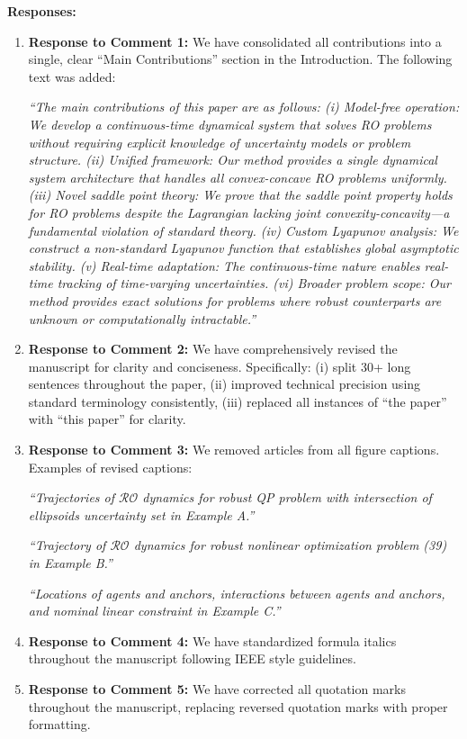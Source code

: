 \documentclass[journal,twoside,web]{ieeecolor}
\begin{document}
\noindent\textbf{Responses:}

\begin{enumerate}
\item \textbf{Response to Comment 1:} We have consolidated all contributions into a single, clear ``Main Contributions'' section in the Introduction. The following text was added:

{\color{revisionblue}\textit{``The main contributions of this paper are as follows: (i) Model-free operation: We develop a continuous-time dynamical system that solves RO problems without requiring explicit knowledge of uncertainty models or problem structure. (ii) Unified framework: Our method provides a single dynamical system architecture that handles all convex-concave RO problems uniformly. (iii) Novel saddle point theory: We prove that the saddle point property holds for RO problems despite the Lagrangian lacking joint convexity-concavity—a fundamental violation of standard theory. (iv) Custom Lyapunov analysis: We construct a non-standard Lyapunov function that establishes global asymptotic stability. (v) Real-time adaptation: The continuous-time nature enables real-time tracking of time-varying uncertainties. (vi) Broader problem scope: Our method provides exact solutions for problems where robust counterparts are unknown or computationally intractable.''}}

\item \textbf{Response to Comment 2:} We have comprehensively revised the manuscript for clarity and conciseness. Specifically: (i) split 30+ long sentences throughout the paper, (ii) improved technical precision using standard terminology consistently, (iii) replaced all instances of ``the paper'' with ``this paper'' for clarity.

\item \textbf{Response to Comment 3:} We removed articles from all figure captions. Examples of revised captions:

{\color{revisionblue}\textit{``Trajectories of $\mathcal{RO}$ dynamics for robust QP problem with intersection of ellipsoids uncertainty set in Example A.''}}

{\color{revisionblue}\textit{``Trajectory of $\mathcal{RO}$ dynamics for robust nonlinear optimization problem (39) in Example B.''}}

{\color{revisionblue}\textit{``Locations of agents and anchors, interactions between agents and anchors, and nominal linear constraint in Example C.''}}

\item \textbf{Response to Comment 4:} We have standardized formula italics throughout the manuscript following IEEE style guidelines.

\item \textbf{Response to Comment 5:} We have corrected all quotation marks throughout the manuscript, replacing reversed quotation marks with proper formatting.
\end{enumerate}
\end{document}
